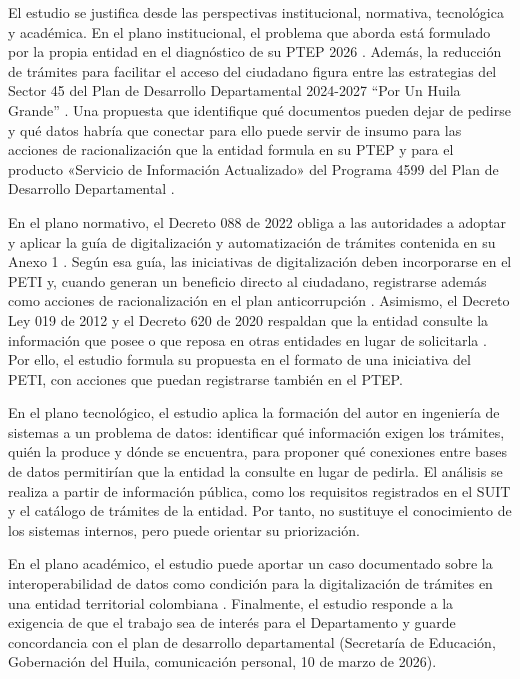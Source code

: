 El estudio se justifica desde las perspectivas institucional, normativa, tecnológica y académica. En el plano institucional, el problema que aborda está formulado por la propia entidad en el diagnóstico de su PTEP 2026 \parencite[p.~134]{gobernaciondelhuila2026ptep}. Además, la reducción de trámites para facilitar el acceso del ciudadano figura entre las estrategias del Sector 45 del Plan de Desarrollo Departamental 2024-2027 \enquote{Por Un Huila Grande} \parencite[p.~187]{gobernaciondelhuila2024ordenanza}. Una propuesta que identifique qué documentos pueden dejar de pedirse y qué datos habría que conectar para ello puede servir de insumo para las acciones de racionalización que la entidad formula en su PTEP y para el producto «Servicio de Información Actualizado» del Programa 4599 del Plan de Desarrollo Departamental \parencite[p.~188]{gobernaciondelhuila2024ordenanza}.

En el plano normativo, el Decreto 088 de 2022 obliga a las autoridades a adoptar y aplicar la guía de digitalización y automatización de trámites contenida en su Anexo 1 \parencite[art.~2.2.20.4]{colombia2022decreto088}. Según esa guía, las iniciativas de digitalización deben incorporarse en el PETI y, cuando generan un beneficio directo al ciudadano, registrarse además como acciones de racionalización en el plan anticorrupción \parencite[Anexo 1, num.~2.3.2]{colombia2022decreto088}. Asimismo, el Decreto Ley 019 de 2012 y el Decreto 620 de 2020 respaldan que la entidad consulte la información que posee o que reposa en otras entidades en lugar de solicitarla \parencites[art.~9]{colombia2012decreto019}[art.~2.2.17.4.7, num.~8]{colombia2020decreto620}. Por ello, el estudio formula su propuesta en el formato de una iniciativa del PETI, con acciones que puedan registrarse también en el PTEP.

En el plano tecnológico, el estudio aplica la formación del autor en ingeniería de sistemas a un problema de datos: identificar qué información exigen los trámites, quién la produce y dónde se encuentra, para proponer qué conexiones entre bases de datos permitirían que la entidad la consulte en lugar de pedirla. El análisis se realiza a partir de información pública, como los requisitos registrados en el SUIT y el catálogo de trámites de la entidad. Por tanto, no sustituye el conocimiento de los sistemas internos, pero puede orientar su priorización.

En el plano académico, el estudio puede aportar un caso documentado sobre la interoperabilidad de datos como condición para la digitalización de trámites en una entidad territorial colombiana . Finalmente, el estudio responde a la exigencia de que el trabajo sea de interés para el Departamento y guarde concordancia con el plan de desarrollo departamental (Secretaría de Educación, Gobernación del Huila, comunicación personal, 10 de marzo de 2026).

